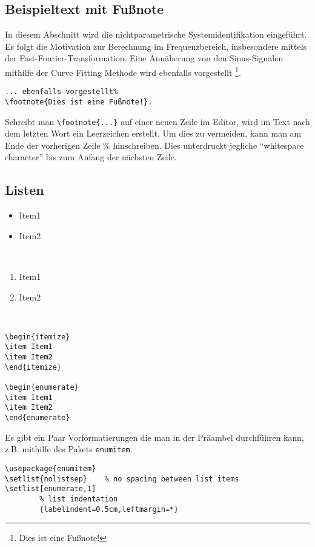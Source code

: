 \subsection{Beispieltext mit Fußnote}
In diesem Abschnitt wird die nichtparametrische Systemidentifikation
eingeführt.
Es folgt die Motivation zur Berechnung im Frequenzbereich,
insbesondere mittels der Fast-Fourier-Trans\-formation.
Eine Annäherung von den Sinus-Signalen mithilfe
der Curve Fitting Methode wird ebenfalls vorgestellt%
\footnote{Dies ist eine Fußnote!}.

\begin{verbatim}
... ebenfalls vorgestellt%
\footnote{Dies ist eine Fußnote!}.
\end{verbatim}

Schreibt man \verb|\footnote{...}| 
auf einer neuen Zeile im Editor, wird im Text nach dem
letzten Wort ein Leerzeichen erstellt.
Um dies zu vermeiden, kann man am Ende der vorherigen Zeile
\% hinschreiben.
Dies unterdruckt jegliche ``whitespace character''
bis zum Anfang der nächsten Zeile.\\

\subsection{Listen}
\begin{itemize}
\item Item1
\item Item2
\end{itemize}~

\begin{enumerate}
\item Item1
\item Item2
\end{enumerate}~

\begin{verbatim}
\begin{itemize}
\item Item1
\item Item2
\end{itemize}

\begin{enumerate}
\item Item1
\item Item2
\end{enumerate}
\end{verbatim}

Es gibt ein Paar Vorformatierungen die man in der Präambel durchführen kann, z.B. mithilfe des Pakets \texttt{enumitem}.
\begin{verbatim}
\usepackage{enumitem}
\setlist{nolistsep}    % no spacing between list items
\setlist[enumerate,1]
		% list indentation
		{labelindent=0.5cm,leftmargin=*}
\end{verbatim}

